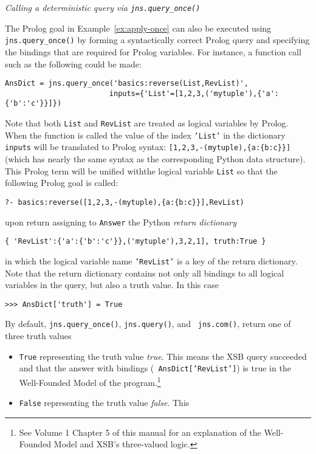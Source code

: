 \begin{example} \rm {\em Calling a deterministic query via {\tt jns.query\_once()}}
  \label{ex:query-once}
  
\noindent
The Prolog goal in Example~\ref{ex:apply-once} can also be executed
using {\tt jns.query\_once()} by forming a syntactically correct Prolog
query and specifying the bindings that are required for Prolog
variables.  For instance, a function call such as the following could
be made:

\begin{verbatim}
AnsDict = jns.query_once('basics:reverse(List,RevList)',
                        inputs={'List'=[1,2,3,('mytuple'),{'a':{'b':'c'}}]})
\end{verbatim}

\noindent
Note that both {\tt List} and {\tt RevList} are treated as logical
variables by Prolog.  When the function is called the value of the
index {\tt 'List'} in the dictionary {\tt inputs} will be translated
to Prolog syntax: \verb|[1,2,3,-(mytuple),{a:{b:c}}]| (which has
nearly the same syntax as the corresponding Python data structure).
This Prolog term will be unified withthe logical variable {\tt List}
so that the following Prolog goal is called:
\begin{verbatim}
?- basics:reverse([1,2,3,-(mytuple),{a:{b:c}}],RevList)
\end{verbatim}
upon return assigning to {\tt Answer} the Python {\em return dictionary}
\begin{verbatim}
{ 'RevList':{'a':{'b':'c'}},('mytuple'),3,2,1], truth:True }
\end{verbatim}
in which the logical variable name {\tt 'RevList'} is a key of the
return dictionary.  Note that the return dictionary contains not only
all bindings to all logical variables in the query, but also a truth
value.  In this case
\begin{verbatim}
>>> AnsDict['truth'] = True
\end{verbatim}
By default, {\tt jns.query\_once()}, {\tt jns.query()}, and {\tt
  jns.com()}, return one of three truth values
\begin{itemize}
\item {\tt True} representing the truth value {\em true}.  This means
  the XSB query succeeded and that the answer with bindings ({\tt
    AnsDict['RevList']}) is true in the Well-Founded Model of the
  program.\footnote{See Volume 1 Chapter 5 of this manual for an
  explanation of the Well-Founded Model and XSB's three-valued logic.}
\item {\tt False} representing the truth value {\em false}.  This

\end{itemize}
\end{example}
